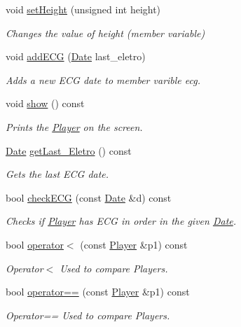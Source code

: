 \begin{DoxyCompactItemize}
void \hyperlink{class_player_a217985fe6c76c9e91a91f4d1c1a82c11}{set\+Height} (unsigned int height)
\begin{DoxyCompactList}\small\item\em Changes the value of height (member variable) \end{DoxyCompactList}\item 
void \hyperlink{class_player_a4309719d18274253a5d00e9940e042d9}{add\+E\+CG} (\hyperlink{class_date}{Date} last\+\_\+eletro)
\begin{DoxyCompactList}\small\item\em Adds a new E\+CG date to member varible ecg. \end{DoxyCompactList}\item 
void \hyperlink{class_player_a623da661c3b627ba79ed595fa8d9a3ea}{show} () const
\begin{DoxyCompactList}\small\item\em Prints the \hyperlink{class_player}{Player} on the screen. \end{DoxyCompactList}\item 
\hyperlink{class_date}{Date} \hyperlink{class_player_ae769d5edba7c2a1defb0d53efe5804a4}{get\+Last\+\_\+\+Eletro} () const
\begin{DoxyCompactList}\small\item\em Gets the last E\+CG date. \end{DoxyCompactList}\item 
bool \hyperlink{class_player_a27612a5782370fda6e67d3e8a2fd9a2d}{check\+E\+CG} (const \hyperlink{class_date}{Date} \&d) const
\begin{DoxyCompactList}\small\item\em Checks if \hyperlink{class_player}{Player} has E\+CG in order in the given \hyperlink{class_date}{Date}. \end{DoxyCompactList}\item 
bool \hyperlink{class_player_a743a295b67be652909a5b1c3252f0d8c}{operator$<$} (const \hyperlink{class_player}{Player} \&p1) const
\begin{DoxyCompactList}\small\item\em Operator$<$ Used to compare Players. \end{DoxyCompactList}\item 
bool \hyperlink{class_player_a81019960e40a67b0cefea0afd3a3100c}{operator==} (const \hyperlink{class_player}{Player} \&p1) const
\begin{DoxyCompactList}\small\item\em Operator== Used to compare Players. \end{DoxyCompactList}\end{DoxyCompactItemize}
